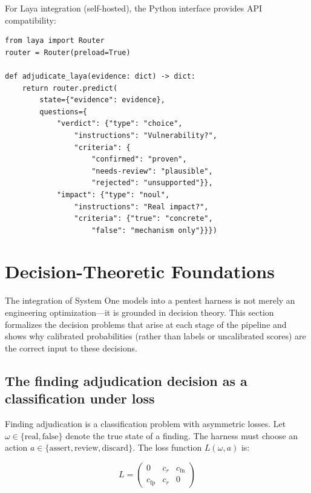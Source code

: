 \documentclass[conference]{IEEEtran}
\begin{document}
\FloatBarrier

For Laya integration (self-hosted), the Python interface provides API compatibility:

\lstset{language=Python}
\begin{lstlisting}[caption={Python: Finding adjudication via Laya.},label={lst:laya}]
from laya import Router
router = Router(preload=True)

def adjudicate_laya(evidence: dict) -> dict:
    return router.predict(
        state={"evidence": evidence},
        questions={
            "verdict": {"type": "choice",
                "instructions": "Vulnerability?",
                "criteria": {
                    "confirmed": "proven",
                    "needs-review": "plausible",
                    "rejected": "unsupported"}},
            "impact": {"type": "noul",
                "instructions": "Real impact?",
                "criteria": {"true": "concrete",
                    "false": "mechanism only"}}})
\end{lstlisting}

\FloatBarrier

\section{Decision-Theoretic Foundations}\label{sec:decision_theory}

The integration of System One models into a pentest harness is not merely an engineering optimization---it is grounded in decision theory. This section formalizes the decision problems that arise at each stage of the pipeline and shows why calibrated probabilities (rather than labels or uncalibrated scores) are the correct input to these decisions.

\subsection{The finding adjudication decision as a classification under loss}

Finding adjudication is a classification problem with asymmetric losses. Let $\omega \in \{\text{real}, \text{false}\}$ denote the true state of a finding. The harness must choose an action $a \in \{\text{assert}, \text{review}, \text{discard}\}$. The loss function $L(\omega, a)$ is:

\begin{equation}
L = \begin{pmatrix} 0 & c_r & c_{\text{fn}} \\ c_{\text{fp}} & c_r & 0 \end{pmatrix}
\end{equation}
\end{document}
